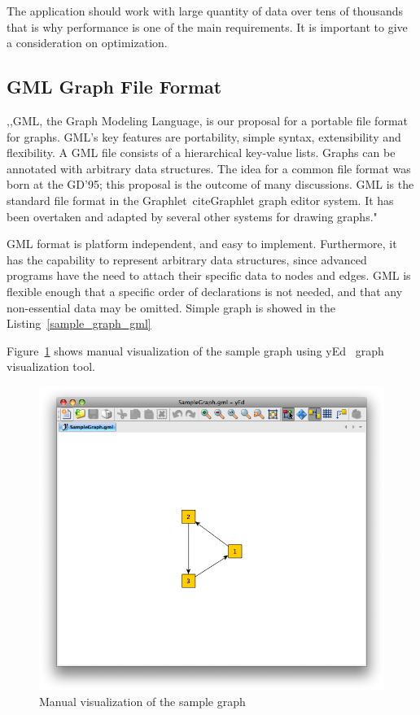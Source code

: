 The application should work with large quantity of data over tens of thousands that is why performance is one of the main requirements. It is important to give a consideration on optimization.

\subsection{GML Graph File Format}
 ,,GML, the Graph Modeling Language, is our proposal for a portable file format for graphs. GML's key features are portability, simple syntax, extensibility and flexibility. A GML file consists of a hierarchical key-value lists. Graphs can be annotated with arbitrary data structures. The idea for a common file format was born at the GD'95; this proposal is the outcome of many discussions. GML is the standard file format in the Graphlet~cite{Graphlet} graph editor system. It has been overtaken and adapted by several other systems for drawing graphs."~\cite{GML}


GML format is platform independent, and easy to implement. Furthermore, it has the capability to represent arbitrary data structures, since advanced programs have the need to attach their specific data to nodes and edges. GML is flexible enough that a specific order of declarations is not needed, and that any non-essential data may be omitted. Simple graph is showed in the Listing~\ref{sample_graph_gml}

\begin{center}
	
\end{center}

Figure~\ref{fig:sample_graph_yed_vis} shows manual visualization of the sample graph using yEd~\cite{yed} graph visualization tool.

\begin{figure}[h!]
\centering
\includegraphics[scale=0.5]{pictures/SampleGraph.png}
\caption{Manual visualization of the sample graph}
\label{fig:sample_graph_yed_vis}
\end{figure}

